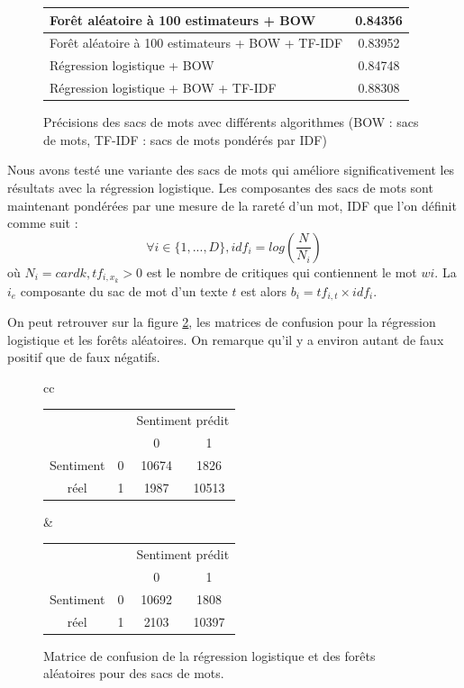 \documentclass{article}
\begin{document}
\begin{figure}[h]
\begin{center}
\begin{tabular}{|l|c|}
	\hline
	Forêt aléatoire à 100 estimateurs + BOW & 0.84356 \\
	\hline
	Forêt aléatoire à 100 estimateurs + BOW + TF-IDF & 0.83952 \\
	\hline
	Régression logistique + BOW & 0.84748 \\
	\hline
	Régression logistique + BOW + TF-IDF & 0.88308 \\
	\hline
\end{tabular}
\caption{Précisions des sacs de mots avec différents algorithmes (BOW : sacs de mots, TF-IDF : sacs de mots pondérés par IDF)}
\label{results_bow}
\end{center}
\end{figure}

Nous avons testé une variante des sacs de mots qui améliore significativement les résultats avec la régression logistique. Les composantes des sacs de mots sont maintenant pondérées par une mesure de la rareté d'un mot, IDF \cite{Salton:1986:IMI:576628} que l'on définit comme suit :
$$
\forall i \in \{1, ..., D\}, idf_{i} = log(\frac{N}{N_{i}})
$$
où $N_{i} = card{k, tf_{i, x_{k}} > 0}$ est le nombre de critiques qui contiennent le mot $w{i}$. La $i_{e}$ composante du sac de mot d'un texte $t$ est alors $b_{i} = tf_{i,t} \times idf_{i}$. 

On peut retrouver sur la figure \ref{confusion_matrices_bow}, les matrices de confusion pour la régression logistique et les forêts aléatoires. On remarque qu'il y a environ autant de faux positif que de faux négatifs.

\begin{figure}[h]
\begin{center}
\begin{tabular}{cc}
\begin{tabular}{|c|c|c|c|}
   \hline
   \multicolumn{2}{|c|}{} & \multicolumn{2}{c|}{Sentiment prédit} \\
   \cline{3-4}
   \multicolumn{2}{|c|}{} & 0     & 1 \\
   \hline
   Sentiment          & 0 & 10674 & 1826 \\
   \cline{2-4}
   réel               & 1 & 1987  & 10513 \\
   \hline
\end{tabular} &
\begin{tabular}{|c|c|c|c|}
   \hline
   \multicolumn{2}{|c|}{} & \multicolumn{2}{c|}{Sentiment prédit} \\
   \cline{3-4}
   \multicolumn{2}{|c|}{} & 0     & 1 \\
   \hline
   Sentiment          & 0 & 10692 & 1808 \\
   \cline{2-4}
   réel               & 1 & 2103  & 10397 \\
   \hline
\end{tabular}
\end{tabular}
\end{center}
\caption{Matrice de confusion de la régression logistique et des forêts aléatoires pour des sacs de mots.}
\label{confusion_matrices_bow}
\end{figure}
\end{document}
